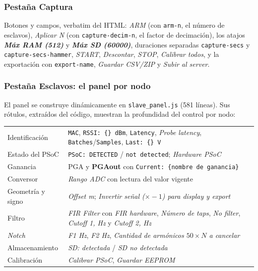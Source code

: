 \subsubsection{Pesta\~na Captura}

Botones y campos, verbatim del HTML: \emph{ARM} (con \texttt{arm-n}, el n\'umero
de esclavos), \emph{Aplicar N} (con \texttt{capture-decim-n}, el factor de
decimaci\'on), los atajos \textbf{\emph{M\'ax RAM (512)}} y \textbf{\emph{M\'ax
SD (60000)}}, duraciones separadas \texttt{capture-secs} y
\texttt{capture-secs-hammer}, \emph{START}, \emph{Descontar}, \emph{STOP},
\emph{Calibrar todos}, y la exportaci\'on con \texttt{export-name},
\emph{Guardar CSV/ZIP} y \emph{Subir al server}.


\subsubsection{Pesta\~na Esclavos: el panel por nodo}

El panel se construye din\'amicamente en \texttt{slave\_panel.js} (581 l\'ineas).
Sus r\'otulos, extra\'idos del c\'odigo, muestran la profundidad del control por
nodo:

\begin{center}\footnotesize
\begin{tabularx}{\textwidth}{@{}l X@{}}
\toprule
Identificaci\'on & \texttt{MAC}, \texttt{RSSI: \{\} dBm}, \texttt{Latency}, \emph{Probe latency}, \texttt{Batches}/\texttt{Samples}, \texttt{Last: \{\} V} \\
Estado del PSoC & \texttt{PSoC: DETECTED} / \texttt{not detected}; \emph{Hardware PSoC} \\
Ganancia & PGA y \textbf{PGAout} con \texttt{Current: \{nombre de ganancia\}} \\
Conversor & \emph{Rango ADC} con lectura del valor vigente \\
Geometr\'ia y signo & \emph{Offset m}; \emph{Invertir se\~nal ($\times-1$) para display y export} \\
Filtro & \emph{FIR Filter} con \emph{FIR hardware}, \emph{N\'umero de taps}, \emph{No filter}, \emph{Cutoff 1, Hz} y \emph{Cutoff 2, Hz} \\
\emph{Notch} & \emph{F1 Hz}, \emph{F2 Hz}, \emph{Cantidad de arm\'onicos $50\times N$ a cancelar} \\
Almacenamiento & \emph{SD: detectada} / \emph{SD no detectada} \\
Calibraci\'on & \emph{Calibrar PSoC}, \emph{Guardar EEPROM} \\
\bottomrule
\end{tabularx}
\end{center}

